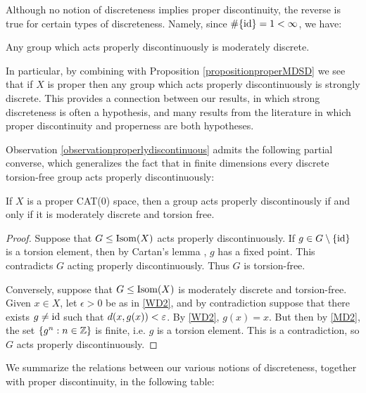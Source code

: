 Although no notion of discreteness implies proper discontinuity, the reverse is true for certain types of discreteness. Namely, since $\#\{\mathrm{id}\} = 1 < \infty$, we have:
\begin{observation}
\label{observationproperlydiscontinuous}
Any group which acts properly discontinuously is moderately discrete.
\end{observation}

In particular, by combining with Proposition \ref{propositionproperMDSD} we see that if $X$ is proper then any group which acts properly discontinuously is strongly discrete. This provides a connection between our results, in which strong discreteness is often a hypothesis, and many results from the literature in which proper discontinuity and properness are both hypotheses.

Observation \ref{observationproperlydiscontinuous} admits the following partial converse, which generalizes the fact that in finite dimensions every discrete torsion-free group acts properly discontinuously: 
\begin{remark}
If $X$ is a proper CAT(0) space, then a group acts properly discontinously if and only if it is moderately discrete and torsion free.
\end{remark}
\begin{proof}
Suppose that $G\leq\operatorname{Isom}(X)$ acts properly discontinuously. If $g\in G\setminus\{\mathrm{id}\}$ is a torsion element, then by Cartan's lemma \cite[II.2.8(1)]{BridsonHaefliger}, $g$ has a fixed point. This contradicts $G$ acting properly discontinuously. Thus $G$ is torsion-free.

Conversely, suppose that $G\leq\operatorname{Isom}(X)$ is moderately discrete and torsion-free. Given $x\in X$, let $\epsilon > 0$ be as in \eqref{WD2}, and by contradiction suppose that there exists $g\neq\mathrm{id}$ such that $d(x,g(x)) < \varepsilon$. By \eqref{WD2}, $g(x) = x$. But then by \eqref{MD2}, the set $\{g^n : n\in\Z\}$ is finite, i.e. $g$ is a torsion element. This is a contradiction, so $G$ acts properly discontinuously.
\end{proof}

We summarize the relations between our various notions of discreteness, together with proper discontinuity, in the following table:

